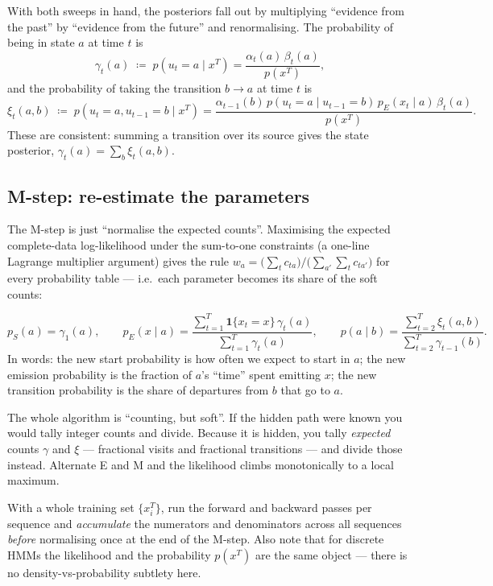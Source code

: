 \documentclass[11pt, oneside]{book}
\newcommand{\ind}{\mathbf{1}}
\newcommand{\eqdef}{\coloneqq}
\begin{document}
With both sweeps in hand, the posteriors fall out by multiplying ``evidence from
the past'' by ``evidence from the future'' and renormalising. The probability of
being in state $a$ at time $t$ is
\[
  \gamma_t(a) \;\eqdef\; p(u_t = a \mid x^T)
   = \frac{\alpha_t(a)\,\beta_t(a)}{p(x^T)},
\]
and the probability of taking the transition $b \to a$ at time $t$ is
\[
  \xi_t(a,b) \;\eqdef\; p(u_t = a, u_{t-1} = b \mid x^T)
   = \frac{\alpha_{t-1}(b)\, p(u_t = a \mid u_{t-1} = b)\,
           p_E(x_t \mid a)\, \beta_t(a)}{p(x^T)}.
\]
These are consistent: summing a transition over its source gives the state
posterior, $\gamma_t(a) = \sum_b \xi_t(a,b)$.

\subsection*{M-step: re-estimate the parameters}

The M-step is just ``normalise the expected counts''. Maximising the expected
complete-data log-likelihood under the sum-to-one constraints (a one-line
Lagrange multiplier argument) gives the rule $w_a = \big(\sum_t c_{ta}\big) /
\big(\sum_{a'}\sum_t c_{ta'}\big)$ for every probability table — i.e.\ each
parameter becomes its share of the soft counts:

\begin{thmbox}[title={Baum-Welch re-estimation (M-step)}]
\[
  p_S(a) = \gamma_1(a), \qquad
  p_E(x \mid a) = \frac{\sum_{t=1}^{T} \ind\{x_t = x\}\,\gamma_t(a)}
                       {\sum_{t=1}^{T} \gamma_t(a)}, \qquad
  p(a \mid b) = \frac{\sum_{t=2}^{T} \xi_t(a,b)}
                     {\sum_{t=2}^{T} \gamma_{t-1}(b)}.
\]
In words: the new start probability is how often we expect to start in $a$; the
new emission probability is the fraction of $a$'s ``time'' spent emitting $x$;
the new transition probability is the share of departures from $b$ that go to
$a$.
\end{thmbox}

\begin{intbox}
The whole algorithm is ``counting, but soft''. If the hidden path were known you
would tally integer counts and divide. Because it is hidden, you tally
\emph{expected} counts $\gamma$ and $\xi$ — fractional visits and fractional
transitions — and divide those instead. Alternate E and M and the likelihood
climbs monotonically to a local maximum.
\end{intbox}

\begin{notebox}[title={Several sequences, and what the likelihood means}]
With a whole training set $\{x^T_i\}$, run the forward and backward passes per
sequence and \emph{accumulate} the numerators and denominators across all
sequences \emph{before} normalising once at the end of the M-step. Also note
that for discrete HMMs the likelihood and the probability $p(x^T)$ are the same
object — there is no density-vs-probability subtlety here.
\end{notebox}
\end{document}
